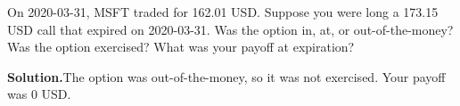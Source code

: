 \noindent On 2020-03-31, MSFT traded for 162.01 USD. Suppose you were long a 173.15 USD call that expired on 2020-03-31. Was the option in, at, or out-of-the-money? Was the option exercised? What was your payoff at expiration?

\vspace{9pt} 

\textbf{Solution.}The option was out-of-the-money, so it was not exercised. Your payoff was 0 USD.
